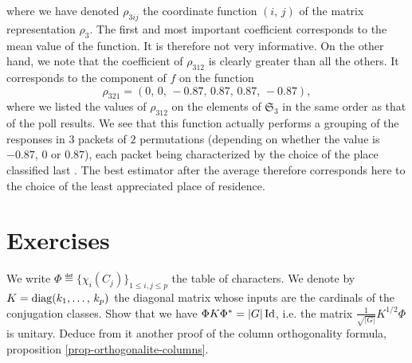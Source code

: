 where we have denoted $ \rho_{3ij} $ the coordinate function $ (i, \, j) $ of the matrix representation $ \rho_3 $. The first and most important coefficient corresponds to the mean value of the function. It is therefore not very informative. On the other hand, we note that the coefficient of $ \rho_{312} $ is clearly greater than all the others. It corresponds to the component of $ f $ on the function
\begin{equation*}
\rho_{321} = (0, \, 0, \, - 0.87, \, 0.87, \, 0.87, \, - 0.87),
\end{equation*}
where we listed the values of $ \rho_{312} $ on the elements of $ \mathfrak{S}_3 $ in the same order as that of the poll results. We see that this function actually performs a grouping of the responses in $ 3 $ packets of $ 2 $ permutations (depending on whether the value is $ -0.87 $, $ 0 $ or $ 0.87 $), each packet being characterized by the choice of the place classified last . The best estimator after the average therefore corresponds here to the choice of the least appreciated place of residence.
\section{Exercises}
\label{sect1-chap6-exercises}
 
 
 
\begin{exo}
\label{exo-orthogonalite-caracteres}
 
  We write $ \Phi \eqdef \{\chi_i (C_j)\}_{1 \leq i, j \leq p} $ the table of characters. We denote by $ K = \operatorname{diag} (k_1, \ldots, \, k_p) $ the diagonal matrix whose inputs are the cardinals of the conjugation classes. Show that we have $ \Phi K \Phi^{*} = |G| \operatorname{Id} $, i.e. the matrix $ \frac{1}{\sqrt{|G|}} K^{1/2} \Phi $ is unitary. Deduce from it another proof of the column orthogonality formula, proposition \ref{prop-orthogonalite-columns}.
\end{exo}
 
